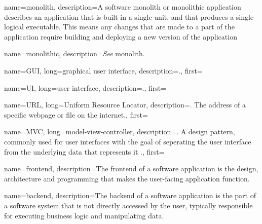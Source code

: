 

{name=monolith, description={A software monolith or monolithic application
    describes an application that is built in a single unit, and that produces a
    single logical executable. This means any changes that are made to a part of
    the application require building and deploying a new version of the
    application \autocite{Fowler_Microservices_2014}}
}

{
    name=monolithic,
    description={\textit{See} \gls{monolith}.}
}

{
    name=GUI,
    long={graphical user interface},
    description={.},
    first=
}

{
    name=UI,
    long={user interface},
    description={.},
    first=
}

{
    name=URL,
    long={Uniform Resource Locator},
    description={. The address of a specific webpage or file on
    the internet.},
    first=
}

{
    name=MVC, 
    long={model-view-controller}, 
    description={. A design pattern, commonly used for user
    interfaces with the goal of seperating the user interface from the
    underlying data that represents it \autocite{Leff_Raylfield_2001}.}, 
    first=
}

{
    name=frontend, 
    description={The frontend of a software application is the design,
    architecture and programming that makes the user-facing application
    function. } 
}

{
    name=backend, 
    description={The backend of a software application is the part of a software
    system that is not directly accessed by the user, typically responsible for
    executing business logic and manipulating data.}
}

